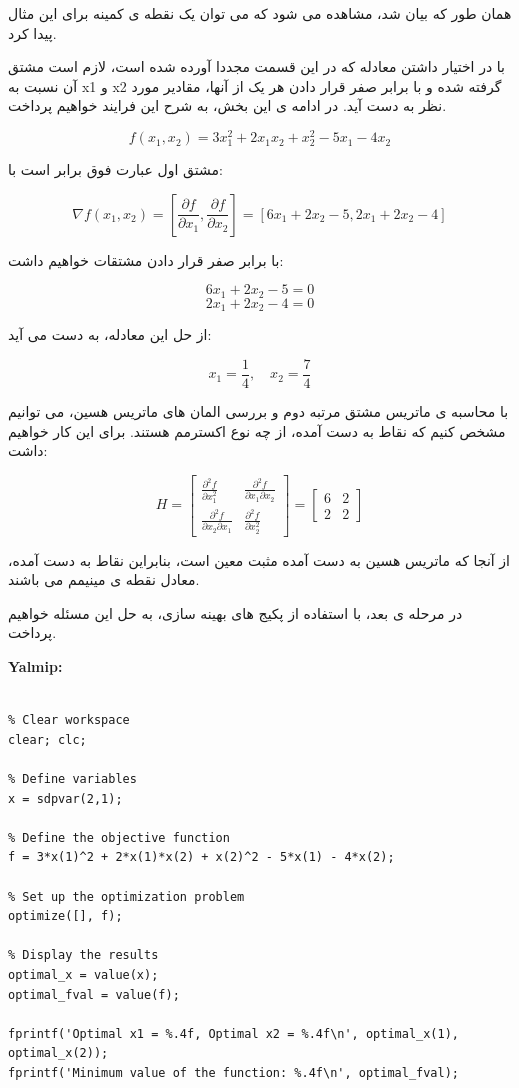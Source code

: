 همان طور که بیان شد، مشاهده می شود که می توان یک نقطه ی کمینه برای این مثال پیدا کرد.

با در اختیار داشتن معادله که در این قسمت مجددا آورده شده است، لازم است مشتق آن نسبت به x1 و x2 گرفته شده و با برابر صفر قرار دادن هر یک از آنها، مقادیر مورد نظر به دست آید. در ادامه ی این بخش، به شرح این فرایند خواهیم پرداخت.

\[
f(x_1, x_2) = 3x_1^2 + 2x_1x_2 + x_2^2 - 5x_1 - 4x_2
\]


مشتق اول عبارت فوق برابر است با:

\[
\nabla f(x_1, x_2) = \left[ \frac{\partial f}{\partial x_1}, \frac{\partial f}{\partial x_2} \right] = \left[ 6x_1 + 2x_2 - 5, 2x_1 + 2x_2 - 4 \right]
\]

با برابر صفر قرار دادن مشتقات خواهیم داشت:

\[
6x_1 + 2x_2 - 5 = 0
\]
\[
2x_1 + 2x_2 - 4 = 0
\]


از حل این معادله، به دست می آید:

\[
x_1 = \frac{1}{4}, \quad
x_2 = \frac{7}{4}
\]

با محاسبه ی ماتریس مشتق مرتبه دوم و بررسی المان های ماتریس هسین، می توانیم مشخص کنیم که نقاط به دست آمده، از چه نوع اکسترمم هستند. برای این کار خواهیم داشت:

\[
H = \begin{bmatrix}
	\frac{\partial^2 f}{\partial x_1^2} & \frac{\partial^2 f}{\partial x_1 \partial x_2} \\
	\frac{\partial^2 f}{\partial x_2 \partial x_1} & \frac{\partial^2 f}{\partial x_2^2}
\end{bmatrix} = \begin{bmatrix}
	6 & 2 \\
	2 & 2
\end{bmatrix}
\]

از آنجا که ماتریس هسین به دست آمده مثبت معین است، بنابراین نقاط به دست آمده، معادل نقطه ی مینیمم می باشند.

در مرحله ی بعد، با استفاده از پکیج های بهینه سازی، به حل این مسئله خواهیم پرداخت.

\textbf{Yalmip:}
\begin{latin}
	\begin{lstlisting}[frame=single,style=Matlab-Pyglike]
		
% Clear workspace
clear; clc;

% Define variables
x = sdpvar(2,1);

% Define the objective function
f = 3*x(1)^2 + 2*x(1)*x(2) + x(2)^2 - 5*x(1) - 4*x(2);

% Set up the optimization problem
optimize([], f);

% Display the results
optimal_x = value(x);
optimal_fval = value(f);

fprintf('Optimal x1 = %.4f, Optimal x2 = %.4f\n', optimal_x(1), optimal_x(2));
fprintf('Minimum value of the function: %.4f\n', optimal_fval);
	\end{lstlisting}
\end{latin}

